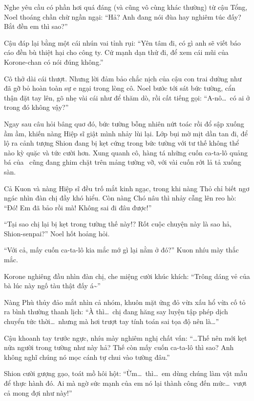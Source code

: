 \documentclass[../main.tex]{subfiles}
\begin{document}
Nghe yêu cầu có phần hơi quá đáng (và cũng vô cùng khác thường) từ cậu Tổng, Noel thoáng chần chừ ngần ngại: ``Hả? Anh đang nói đùa hay nghiêm túc đấy? Bắt đền em thì sao?''

Cậu đáp lại bằng một cái nhún vai tỉnh rụi: ``Yên tâm đi, có gì anh sẽ viết báo cáo đền bù thiệt hại cho công ty. Cứ mạnh dạn thử đi, để xem cái mũi của Korone-chan có nói đúng không.''

Cô thở dài cái thượt. Nhưng lời đảm bảo chắc nịch của cậu con trai dường như đã gỡ bỏ hoàn toàn sự e ngại trong lòng cô. Noel bước tới sát bức tường, cẩn thận đặt tay lên, gõ nhẹ vài cái như để thăm dò, rồi cất tiếng gọi: ``A-nô\dots\ có ai ở trong đó không vậy?''

Ngay sau câu hỏi bâng quơ đó, bức tường bỗng nhiên nứt toác rồi đổ sập xuống ầm ầm, khiến nàng Hiệp sĩ giật mình nhảy lùi lại. Lớp bụi mờ mịt dần tan đi, để lộ ra cảnh tượng Shion đang bị kẹt cứng trong bức tường với tư thế không thể nào kỳ quặc và tức cười hơn. Xung quanh cô, hàng tá những cuốn ca-ta-lô quảng bá của \hll\ cũng đang ghim chặt trên mảng tường vỡ, với vài cuốn rớt lả tả xuống sàn.


Cả Kuon và nàng Hiệp sĩ đều trố mắt kinh ngạc, trong khi nàng Thỏ chỉ biết ngơ ngác nhìn đàn chị đầy khó hiểu. Còn nàng Chó nâu thì nhảy cẫng lên reo hò: ``Đó! Em đã bảo rồi mà! Không sai đi đâu được!''

``Tại sao chị lại bị kẹt trong tường thế này!? Rốt cuộc chuyện này là sao hả, Shion-senpai?'' Noel hốt hoảng hỏi.

``Với cả, mấy cuốn ca-ta-lô kia mắc mớ gì lại nằm ở đó?'' Kuon nhíu mày thắc mắc.

Korone nghiêng đầu nhìn đàn chị, che miệng cười khúc khích: ``Trông dáng vẻ của bà lúc này ngố tàu thật đấy á\~{}''

Nàng Phù thủy đảo mắt nhìn cả nhóm, khuôn mặt ửng đỏ vừa xấu hổ vừa cố tỏ ra bình thường thanh lịch: ``À thì\dots\ chị đang hăng say luyện tập phép dịch chuyển tức thời\dots\ nhưng mà hơi trượt tay tính toán sai tọa độ nên là\dots''

Cậu khoanh tay trước ngực, nhíu mày nghiêm nghị chất vấn: ``\dots Thế nên mới kẹt nửa người trong tường như này hả? Thế còn mấy cuốn ca-ta-lô thì sao? Anh không nghĩ chúng nó mọc cánh tự chui vào tường đâu.''

Shion cười gượng gạo, toát mồ hôi hột: ``Ừm\dots\ thì\dots\ em dùng chúng làm vật mẫu để thực hành đó. Ai mà ngờ sức mạnh của em nó lại thành công đến mức\dots\ vượt cả mong đợi như này!''
\end{document}
